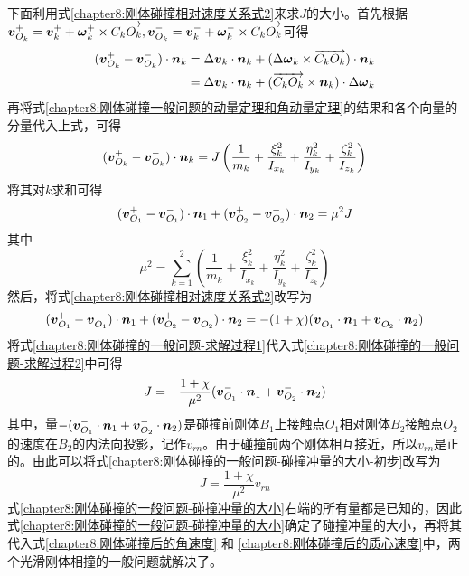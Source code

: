 下面利用式\eqref{chapter8:刚体碰撞相对速度关系式2}来求$J$的大小。首先根据$\boldsymbol{v}_{O_k}^+=\boldsymbol{v}_k^++\boldsymbol{\omega}_k^+\times \overrightarrow{C_kO_k}, \boldsymbol{v}_{O_k}^-=\boldsymbol{v}_k^-+\boldsymbol{\omega}_k^-\times\overrightarrow{C_kO_k}$可得
\begin{align*}
	(\boldsymbol{v}_{O_k}^+-\boldsymbol{v}_{O_k}^-) \cdot \boldsymbol{n}_k & = \Delta\boldsymbol{v}_k \cdot \boldsymbol{n}_k + (\Delta\boldsymbol{\omega}_k\times \overrightarrow{C_kO_k})\cdot \boldsymbol{n}_k \\
	& = \Delta\boldsymbol{v}_k \cdot \boldsymbol{n}_k + (\overrightarrow{C_kO_k} \times \boldsymbol{n}_k)\cdot \Delta\boldsymbol{\omega}_k
\end{align*}
再将式\eqref{chapter8:刚体碰撞一般问题的动量定理和角动量定理}的结果和各个向量的分量代入上式，可得
\begin{equation*}
	(\boldsymbol{v}_{O_k}^+-\boldsymbol{v}_{O_k}^-) \cdot \boldsymbol{n}_k = J\left(\frac{1}{m_k}+\frac{\xi_k^2}{I_{x_k}}+\frac{\eta_k^2}{I_{y_k}}+\frac{\zeta_k^2}{I_{z_k}}\right)
\end{equation*}
将其对$k$求和可得
\begin{equation}
	(\boldsymbol{v}_{O_1}^+-\boldsymbol{v}_{O_1}^-) \cdot \boldsymbol{n}_1 + (\boldsymbol{v}_{O_2}^+-\boldsymbol{v}_{O_2}^-) \cdot \boldsymbol{n}_2 = \mu^2J
	\label{chapter8:刚体碰撞的一般问题-求解过程1}
\end{equation}
其中
\begin{equation}
	\mu^2 = \sum_{k=1}^2\left(\frac{1}{m_k}+\frac{\xi_k^2}{I_{x_k}}+\frac{\eta_k^2}{I_{y_k}}+\frac{\zeta_k^2}{I_{z_k}}\right)
\end{equation}
然后，将式\eqref{chapter8:刚体碰撞相对速度关系式2}改写为
\begin{equation}
	(\boldsymbol{v}_{O_1}^+-\boldsymbol{v}_{O_1}^-) \cdot \boldsymbol{n}_1 + (\boldsymbol{v}_{O_2}^+-\boldsymbol{v}_{O_2}^-) \cdot \boldsymbol{n}_2 = -(1+\chi)(\boldsymbol{v}_{O_1}^-\cdot \boldsymbol{n}_1+\boldsymbol{v}_{O_2}^-\cdot \boldsymbol{n}_2)
	\label{chapter8:刚体碰撞的一般问题-求解过程2}
\end{equation}
将式\eqref{chapter8:刚体碰撞的一般问题-求解过程1}代入式\eqref{chapter8:刚体碰撞的一般问题-求解过程2}中可得
\begin{equation}
	J = -\frac{1+\chi}{\mu^2}(\boldsymbol{v}_{O_1}^-\cdot \boldsymbol{n}_1+\boldsymbol{v}_{O_2}^-\cdot \boldsymbol{n}_2)
	\label{chapter8:刚体碰撞的一般问题-碰撞冲量的大小-初步}
\end{equation}
其中，量$-(\boldsymbol{v}_{O_1}^-\cdot \boldsymbol{n}_1+\boldsymbol{v}_{O_2}^-\cdot \boldsymbol{n}_2)$是碰撞前刚体$B_1$上接触点$O_1$相对刚体$B_2$接触点$O_2$的速度在$B_2$的内法向投影，记作$v_{rn}$。由于碰撞前两个刚体相互接近，所以$v_{rn}$是正的。由此可以将式\eqref{chapter8:刚体碰撞的一般问题-碰撞冲量的大小-初步}改写为
\begin{equation}
	J = \frac{1+\chi}{\mu^2}v_{rn}
	\label{chapter8:刚体碰撞的一般问题-碰撞冲量的大小}
\end{equation}
式\eqref{chapter8:刚体碰撞的一般问题-碰撞冲量的大小}右端的所有量都是已知的，因此式\eqref{chapter8:刚体碰撞的一般问题-碰撞冲量的大小}确定了碰撞冲量的大小，再将其代入式\eqref{chapter8:刚体碰撞后的角速度} 和 \eqref{chapter8:刚体碰撞后的质心速度}中，两个光滑刚体相撞的一般问题就解决了。

